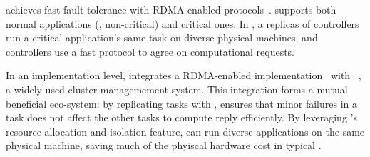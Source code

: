 \xxx achieves fast fault-tolerance with RDMA-enabled 
\paxos protocols~\cite{dare:hpdc15,falcon:github}. \xxx supports both normal 
applications (\ie, non-critical) and critical ones. In \xxx, a replicas of 
controllers run a critical application's same task on diverse physical 
machines, and controllers use a fast \paxos protocol to agree on computational 
requests. 

In an implementation level, \xxx integrates a RDMA-enabled \paxos 
implementation~\cite{falcon:github} with \mesos~\cite{mesos}, a widely used 
cluster managemement system. This integration forms a mutual beneficial 
eco-system: by replicating tasks with \paxos, \xxx ensures that minor failures 
in a task does not affect the other tasks to compute reply efficiently. By 
leveraging \mesos's resource allocation and isolation feature, \xxx can run 
diverse applications on the same physical machine, saving much of the phyiscal 
hardware cost in typical \paxos.








